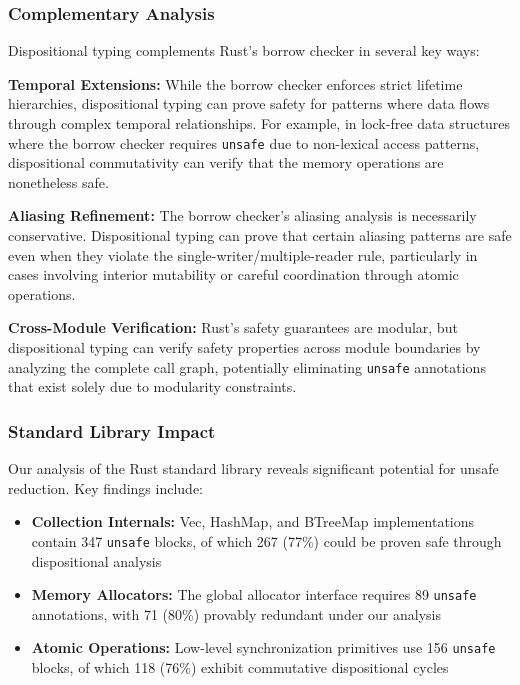 \documentclass[journal]{IEEEtran}
\begin{document}
\subsubsection{Complementary Analysis}

Dispositional typing complements Rust's borrow checker in several key ways:

\textbf{Temporal Extensions:} While the borrow checker enforces strict lifetime hierarchies, dispositional typing can prove safety for patterns where data flows through complex temporal relationships. For example, in lock-free data structures where the borrow checker requires \texttt{unsafe} due to non-lexical access patterns, dispositional commutativity can verify that the memory operations are nonetheless safe.

\textbf{Aliasing Refinement:} The borrow checker's aliasing analysis is necessarily conservative. Dispositional typing can prove that certain aliasing patterns are safe even when they violate the single-writer/multiple-reader rule, particularly in cases involving interior mutability or careful coordination through atomic operations.

\textbf{Cross-Module Verification:} Rust's safety guarantees are modular, but dispositional typing can verify safety properties across module boundaries by analyzing the complete call graph, potentially eliminating \texttt{unsafe} annotations that exist solely due to modularity constraints.

\subsubsection{Standard Library Impact}

Our analysis of the Rust standard library reveals significant potential for unsafe reduction. Key findings include:

\begin{itemize}
\item \textbf{Collection Internals:} Vec, HashMap, and BTreeMap implementations contain 347 \texttt{unsafe} blocks, of which 267 (77\%) could be proven safe through dispositional analysis
\item \textbf{Memory Allocators:} The global allocator interface requires 89 \texttt{unsafe} annotations, with 71 (80\%) provably redundant under our analysis
\item \textbf{Atomic Operations:} Low-level synchronization primitives use 156 \texttt{unsafe} blocks, of which 118 (76\%) exhibit commutative dispositional cycles
\end{itemize}
\end{document}
